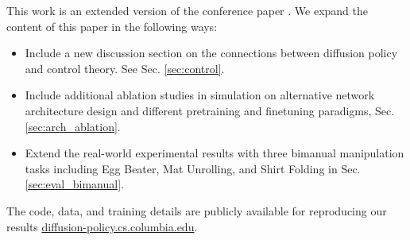 This work is an extended version of the conference paper \cite{chi2023diffusionpolicy}.  We expand the content of this paper in the following ways: 
\begin{itemize} 
\item Include a new discussion section on the connections between diffusion policy and control theory. See Sec. \ref{sec:control}.   
\item Include additional ablation studies in simulation on alternative network architecture design and different pretraining and finetuning paradigms, Sec. \ref{sec:arch_ablation}.  
\item Extend the real-world experimental results with three bimanual manipulation tasks including  Egg Beater, Mat Unrolling, and Shirt Folding in  Sec. \ref{sec:eval_bimanual}. 
\end{itemize}

The code, data, and training details are publicly available for reproducing our results \url{diffusion-policy.cs.columbia.edu}.  
